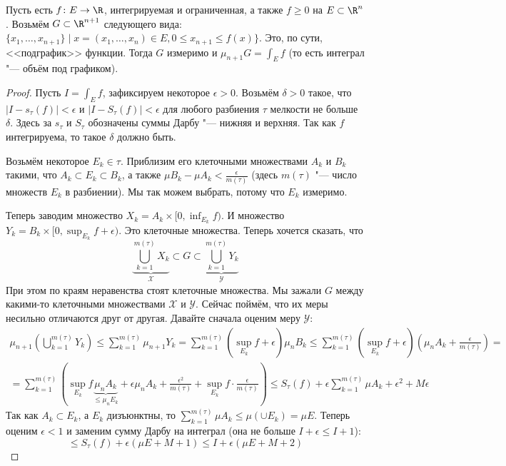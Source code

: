 \begin{theorem}
	Пусть есть $f \colon E \to \R$, интегрируемая и ограниченная, а также $f \ge 0$ на $E \subset \R^n$.
	Возьмём $G \subset \R^{n+1}$ следующего вида: $\{ x_1, \dots, x_{n+1} \} \mid x=(x_1,\dots,x_n) \in E, 0 \le x_{n+1} \le f(x) \}$.
	Это, по сути, <<подграфик>> функции.
	Тогда $G$ измеримо и $\mu_{n+1} G = \int_E f$ (то есть интеграл "--- объём под графиком).
\end{theorem}
\begin{proof}
	Пусть $I = \int_E f$, зафиксируем некоторое $\epsilon > 0$.
	Возьмём $\delta > 0$ такое, что $|I-s_\tau(f)| < \epsilon$ и $|I - S_\tau(f)| < \epsilon$
	для любого разбиения $\tau$ мелкости не больше $\delta$.
	Здесь за $s_\tau$ и $S_\tau$ обозначены суммы Дарбу "--- нижняя и верхняя.
	Так как $f$ интегрируема, то такое $\delta$ должно быть.

	Возьмём некоторое $E_k \in \tau$.
	Приблизим его клеточными множествами $A_k$ и $B_k$ такими, что $A_k \subset E_k \subset B_k$,
	а также $\mu B_k - \mu A_k < \frac{\epsilon}{m(\tau)}$ (здесь $m(\tau)$ "--- число множеств $E_k$ в разбиении).
	Мы так можем выбрать, потому что $E_k$ измеримо.

	Теперь заводим множество $X_k = A_k \times [0, \inf_{E_k} f)$.
	И множество $Y_k = B_k \times [0, \sup_{E_k} f + \epsilon)$.
	Это клеточные множества.
	Теперь хочется сказать, что
	\[
	\underbrace{\bigcup_{k=1}^{m(\tau)} X_k}_{\mathcal{X}} \subset G \subset \underbrace{\bigcup_{k=1}^{m(\tau)} Y_k}_{\mathcal{Y}}
	\]
	При этом по краям неравенства стоят клеточные множества.
	Мы зажали $G$ между какими-то клеточными множествами $\mathcal{X}$ и $\mathcal{Y}$.
	Сейчас поймём, что их меры несильно отличаются друг от другая.
	Давайте сначала оценим меру $\mathcal{Y}$:
	\newcommand{\mysum}{\sum_{k=1}^{m(\tau)}}
	\begin{gather*}
	\mu_{n+1} \left( \bigcup_{k=1}^{m(\tau)} Y_k\right)
	\le \mysum \mu_{n+1} Y_k
	= \mysum (\sup_{E_k} f + \epsilon) \mu_{n} B_k
	\le \mysum (\sup_{E_k} f + \epsilon) (\mu_{n} A_k + \frac{\epsilon}{m(\tau)}) = \\
	= \mysum (\sup_{E_k} f \underbrace{\mu_n A_k}_{\le \mu_n E_k} + \epsilon \mu_n A_k + \frac{\epsilon^2}{m(\tau)} + \sup_{E_k} f \cdot \frac{\epsilon}{m(\tau)})
	\le S_\tau(f) + \epsilon\mysum \mu A_k + \epsilon^2 + M\epsilon
	\end{gather*}
	Так как $A_k \subset E_k$, а $E_k$ дизъюнктны, то $\mysum \mu A_k \le \mu (\cup E_k) = \mu E$.
	Теперь оценим $\epsilon < 1$ и заменим сумму Дарбу на интеграл (она не больше $I+\epsilon \le I+1$):
	\[
	\le S_\tau(f) + \epsilon(\mu E + M + 1)
	\le I + \epsilon(\mu E + M + 2)
	\]


\end{proof}
